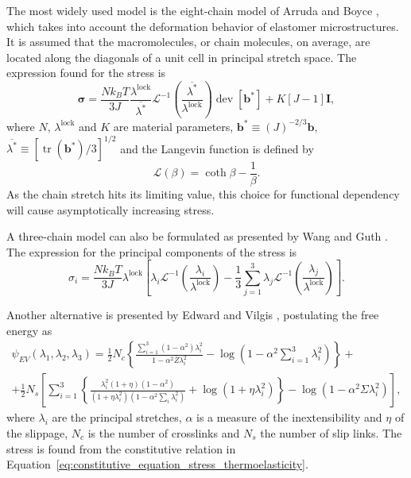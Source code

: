 The most widely used model is the eight-chain model of Arruda and Boyce \citep{arrudaEvolutionPlasticAnisotropy1993, arrudaEffectsStrainRate1995}, which takes into account the deformation behavior of elastomer microstructures.
It is assumed that the macromolecules, or chain molecules, on average, are located along the diagonals of a unit cell in principal stretch space.
The expression found for the stress is
\begin{equation}
	\label{eq:eigth_chain_model}
	\bm \sigma = \frac{Nk_BT}{3J} \frac{\lambda^\text{lock}}{\overline{\lambda^*}}\mathcal L^{-1}\left(\frac{\overline{\lambda^*}}{\lambda^\text{lock}}\right)\operatorname{dev} [\bm b^*] + K [J-1]\bm I,
\end{equation}
where $N$, $\lambda^\text{lock}$ and $K$ are material parameters, $\bm b^*\equiv (J)^{-2/3}\bm b$, $\overline{\lambda^*}\equiv [\operatorname{tr}(\bm b^*)/3]^{1/2}$ and the Langevin function is defined by
\begin{equation}
	\mathcal L(\beta) = \coth \beta - \frac{1}{\beta}.
\end{equation}
As the chain stretch hits its limiting value, this choice for functional dependency will cause asymptotically increasing stress.

A three-chain model can also be formulated as presented by Wang and Guth \citep{wangStatisticalTheoryNetworks1952}.
The expression for the principal components of the stress is
\begin{equation}
	\label{eq:three_chain_model}
	\sigma_i=\frac{Nk_B T}{3J} \lambda^\text{lock} \left[\lambda_i \mathcal L^{-1}\left(\frac{\lambda_i}{\lambda^\text{lock}}\right) - \frac{1}{3} \sum_{j=1}^3 \lambda_j \mathcal L^{-1}\left(\frac{\lambda_j}{\lambda^\text{lock}}\right)\right].
\end{equation}

Another alternative is presented by Edward and Vilgis \citep{edwardsEffectEntanglementsRubber1986}, postulating the free energy as
\begin{multline}
  \label{eq:edward_vilgis_model}
	\psi_{EV}(\lambda_1, \lambda_2, \lambda_3) = \frac{1}{2} N_c\left\{\frac{\sum_{i=1}^3\left(1-\alpha^2\right) \lambda_i^2}{1-\alpha^2 \bar{Z} \lambda_i^2}-\log \left(1-\alpha^2 \sum_{i=1}^3 \lambda_i^2\right)\right\}+ \\
	+\frac{1}{2} N_s\left[\sum_{i=1}^3\left\{\frac{\lambda_i^2(1+\eta)\left(1-\alpha^2\right)}{\left(1+\eta \lambda_i^2\right)\left(1-\alpha^2 \sum_i \lambda_i^2\right)}+\log \left(1+\eta \lambda_i^2\right)\right\}-\log \left(1-\alpha^2 \Sigma \lambda_i^2\right)\right],
\end{multline}
where $\lambda_i$ are the principal stretches, $\alpha$ is a measure of the inextensibility and $\eta$ of the slippage, $N_c$ is the number of crosslinks and $N_s$ the number of slip links.
The stress is found from the constitutive relation in Equation~\eqref{eq:constitutive_equation_stress_thermoelasticity}.

